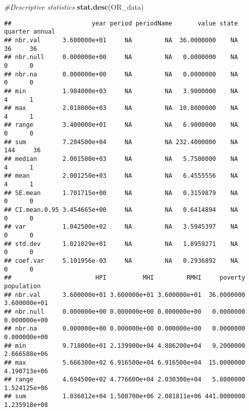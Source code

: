 \documentclass[
]{article}
\newenvironment{Shaded}{\begin{snugshade}}{\end{snugshade}}
\newcommand{\CommentTok}[1]{\textcolor[rgb]{0.56,0.35,0.01}{\textit{#1}}}
\newcommand{\KeywordTok}[1]{\textcolor[rgb]{0.13,0.29,0.53}{\textbf{#1}}}
\newcommand{\NormalTok}[1]{#1}
\newcommand{\OperatorTok}[1]{\textcolor[rgb]{0.81,0.36,0.00}{\textbf{#1}}}
\newcommand{\StringTok}[1]{\textcolor[rgb]{0.31,0.60,0.02}{#1}}
\begin{document}
\begin{Shaded}
\end{Shaded}

\begin{Shaded}
\begin{Highlighting}[]
\CommentTok{#Descriptive statistics}
\KeywordTok{stat.desc}\NormalTok{(OR_data)}
\end{Highlighting}
\end{Shaded}

\begin{verbatim}
##                      year period periodName       value state quarter annual
## nbr.val      3.600000e+01     NA         NA  36.0000000    NA      36     36
## nbr.null     0.000000e+00     NA         NA   0.0000000    NA       0      0
## nbr.na       0.000000e+00     NA         NA   0.0000000    NA       0      0
## min          1.984000e+03     NA         NA   3.9000000    NA       4      1
## max          2.018000e+03     NA         NA  10.8000000    NA       4      1
## range        3.400000e+01     NA         NA   6.9000000    NA       0      0
## sum          7.204500e+04     NA         NA 232.4000000    NA     144     36
## median       2.001500e+03     NA         NA   5.7500000    NA       4      1
## mean         2.001250e+03     NA         NA   6.4555556    NA       4      1
## SE.mean      1.701715e+00     NA         NA   0.3159879    NA       0      0
## CI.mean.0.95 3.454665e+00     NA         NA   0.6414894    NA       0      0
## var          1.042500e+02     NA         NA   3.5945397    NA       0      0
## std.dev      1.021029e+01     NA         NA   1.8959271    NA       0      0
## coef.var     5.101956e-03     NA         NA   0.2936892    NA       0      0
##                       HPI          MHI         RMHI     poverty   population
## nbr.val      3.600000e+01 3.600000e+01 3.600000e+01  36.0000000 3.600000e+01
## nbr.null     0.000000e+00 0.000000e+00 0.000000e+00   0.0000000 0.000000e+00
## nbr.na       0.000000e+00 0.000000e+00 0.000000e+00   0.0000000 0.000000e+00
## min          9.718000e+01 2.139900e+04 4.886200e+04   9.2000000 2.666588e+06
## max          5.666300e+02 6.916500e+04 6.916500e+04  15.0000000 4.190713e+06
## range        4.694500e+02 4.776600e+04 2.030300e+04   5.8000000 1.524125e+06
## sum          1.036012e+04 1.508700e+06 2.081811e+06 441.0000000 1.235918e+08

\end{verbatim}
\end{document}
